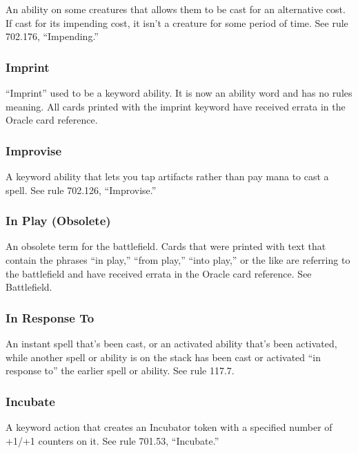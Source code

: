 {{{{{{{{{{{{{{{{An ability on some creatures that allows them to be cast for an alternative cost. If cast for its impending cost, it isn’t a creature for some period of time. See rule 702.176, “Impending.”

\subsubsection*{Imprint}

“Imprint” used to be a keyword ability. It is now an ability word and has no rules meaning. All cards printed with the imprint keyword have received errata in the Oracle card reference.

\subsubsection*{Improvise}

A keyword ability that lets you tap artifacts rather than pay mana to cast a spell. See rule 702.126, “Improvise.”

\subsubsection*{In Play (Obsolete)}

An obsolete term for the battlefield. Cards that were printed with text that contain the phrases “in play,” “from play,” “into play,” or the like are referring to the battlefield and have received errata in the Oracle card reference. See Battlefield.

\subsubsection*{In Response To}

An instant spell that’s been cast, or an activated ability that’s been activated, while another spell or ability is on the stack has been cast or activated “in response to” the earlier spell or ability. See rule 117.7.

\subsubsection*{Incubate}

A keyword action that creates an Incubator token with a specified number of +1/+1 counters on it. See rule 701.53, “Incubate.”

}}}}}}}}}}}}}}}}

